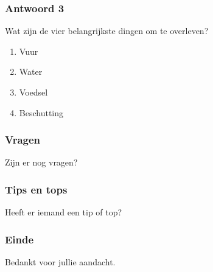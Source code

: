 \documentclass[a4paper, handout]{beamer}
\begin{document}
\begin{frame}
	\frametitle{Antwoord 3}
	Wat zijn de vier belangrijkste dingen om te overleven?
	\begin{enumerate}
		\item{Vuur}
		\item{Water}
		\item{Voedsel}
		\item{Beschutting}
	\end{enumerate}
\end{frame}

\begin{frame}
	\frametitle{Vragen}
	Zijn er nog vragen?
\end{frame}

\begin{frame}
	\frametitle{Tips en tops}
	Heeft er iemand een tip of top?
\end{frame}

\begin{frame}
	\frametitle{Einde}
	Bedankt voor jullie aandacht.	
\end{frame}
\end{document}
